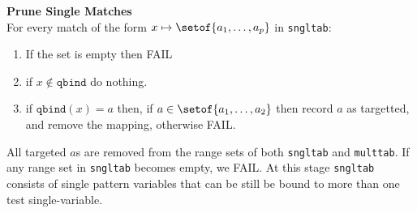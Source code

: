 \textbf{Prune Single Matches}\\
  For every match of the form $x \mapsto \setof{a_1,\ldots,a_p}$ in \texttt{sngltab}:
  \begin{enumerate}
    \item If the set is empty then FAIL
    \item if $x \notin \texttt{qbind}$ do nothing.
    \item if $\texttt{qbind}(x) = a$ then, if $a \in \setof{a_1,\ldots,a_2}$
     then record $a$ as targetted, and remove the mapping,
     otherwise FAIL.
  \end{enumerate}
  All targeted $a$s are removed
  from the range sets of both \texttt{sngltab} and \texttt{multtab}.
  If any range set in \texttt{sngltab} becomes empty, we FAIL.
  At this stage \texttt{sngltab} consists of single pattern variables
  that can be still be bound to more than one test single-variable.
